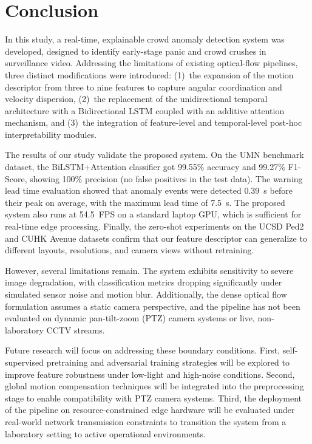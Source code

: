 \section{Conclusion}

In this study, a real-time, explainable crowd anomaly detection system was developed, designed to identify early-stage panic and crowd crushes in surveillance video. Addressing the limitations of existing optical-flow pipelines, three distinct modifications were introduced: (1)~the expansion of the motion descriptor from three to nine features to capture angular coordination and velocity dispersion, (2)~the replacement of the unidirectional temporal architecture with a Bidirectional LSTM coupled with an additive attention mechanism, and (3)~the integration of feature-level and temporal-level post-hoc interpretability modules.

The results of our study validate the proposed system. On the UMN benchmark dataset, the BiLSTM+Attention classifier got 99.55\% accuracy and 99.27\% F1-Score, showing 100\% precision (no false positives in the test data). The warning lead time evaluation showed that anomaly events were detected 0.39~s before their peak on average, with the maximum lead time of 7.5~s. The proposed system also runs at 54.5~FPS on a standard laptop GPU, which is sufficient for real-time edge processing. Finally, the zero-shot experiments on the UCSD Ped2 and CUHK Avenue datasets confirm that our feature descriptor can generalize to different layouts, resolutions, and camera views without retraining.

However, several limitations remain. The system exhibits sensitivity to severe image degradation, with classification metrics dropping significantly under simulated sensor noise and motion blur. Additionally, the dense optical flow formulation assumes a static camera perspective, and the pipeline has not been evaluated on dynamic pan-tilt-zoom (PTZ) camera systems or live, non-laboratory CCTV streams.

Future research will focus on addressing these boundary conditions. First, self-supervised pretraining and adversarial training strategies will be explored to improve feature robustness under low-light and high-noise conditions. Second, global motion compensation techniques will be integrated into the preprocessing stage to enable compatibility with PTZ camera systems. Third, the deployment of the pipeline on resource-constrained edge hardware will be evaluated under real-world network transmission constraints to transition the system from a laboratory setting to active operational environments.
